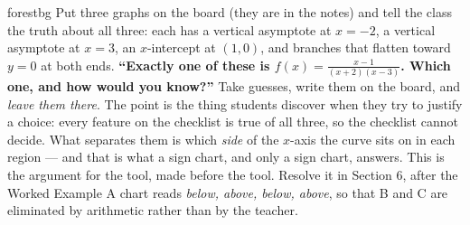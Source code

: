 \documentclass[10pt]{article}
\begin{document}
\begin{skillbox}[Hook]{forestbg}
    Put three graphs on the board (they are in the notes) and tell the class the truth about all three:
    each has a vertical asymptote at $x=-2$, a vertical asymptote at $x=3$, an $x$-intercept at
    $(1,0)$, and branches that flatten toward $y=0$ at both ends. \textbf{``Exactly one of these is
    $f(x)=\frac{x-1}{(x+2)(x-3)}$. Which one, and how would you know?''} Take guesses, write them on
    the board, and \emph{leave them there}. The point is the thing students discover when they try to
    justify a choice: every feature on the checklist is true of all three, so the checklist cannot
    decide. What separates them is which \emph{side} of the $x$-axis the curve sits on in each region
    --- and that is what a sign chart, and only a sign chart, answers. This is the argument for the
    tool, made before the tool. Resolve it in Section 6, after the Worked Example A chart reads
    \emph{below, above, below, above}, so that B and C are eliminated by arithmetic rather than by the
    teacher.
\end{skillbox}
\end{document}
